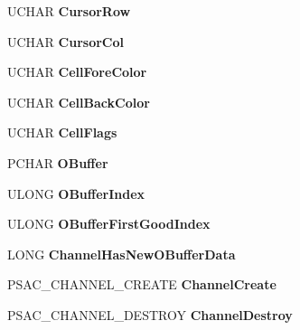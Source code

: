 \begin{DoxyCompactItemize}
U\+C\+H\+AR {\bfseries Cursor\+Row}
\item 
\mbox{\label{struct___s_a_c___c_h_a_n_n_e_l_a74e58345986901edece4d1c602bc3a98}} 
U\+C\+H\+AR {\bfseries Cursor\+Col}
\item 
\mbox{\label{struct___s_a_c___c_h_a_n_n_e_l_a8a955ed1cd5df6ea4d95e5224ae60296}} 
U\+C\+H\+AR {\bfseries Cell\+Fore\+Color}
\item 
\mbox{\label{struct___s_a_c___c_h_a_n_n_e_l_ae06e9fb8bd1d5fe9b3a111cab7cd0c3c}} 
U\+C\+H\+AR {\bfseries Cell\+Back\+Color}
\item 
\mbox{\label{struct___s_a_c___c_h_a_n_n_e_l_a3875ae45764a80e0c99e32d5603cee0c}} 
U\+C\+H\+AR {\bfseries Cell\+Flags}
\item 
\mbox{\label{struct___s_a_c___c_h_a_n_n_e_l_a75dd15cb51a4fc46b90a0b940163390a}} 
P\+C\+H\+AR {\bfseries O\+Buffer}
\item 
\mbox{\label{struct___s_a_c___c_h_a_n_n_e_l_ae4f5308ce9e3b081e3c7c4deb0a412f3}} 
U\+L\+O\+NG {\bfseries O\+Buffer\+Index}
\item 
\mbox{\label{struct___s_a_c___c_h_a_n_n_e_l_ac745b2b8be4ea404e48f4fe2f0ec9a2d}} 
U\+L\+O\+NG {\bfseries O\+Buffer\+First\+Good\+Index}
\item 
\mbox{\label{struct___s_a_c___c_h_a_n_n_e_l_ab97c5199439172d12e2cea63761101af}} 
L\+O\+NG {\bfseries Channel\+Has\+New\+O\+Buffer\+Data}
\item 
\mbox{\label{struct___s_a_c___c_h_a_n_n_e_l_ad499841a7c3979d0938f7a6b17aa8e36}} 
P\+S\+A\+C\+\_\+\+C\+H\+A\+N\+N\+E\+L\+\_\+\+C\+R\+E\+A\+TE {\bfseries Channel\+Create}
\item 
\mbox{\label{struct___s_a_c___c_h_a_n_n_e_l_a988cdd492b9bc68594a6d7b7db53f7b5}} 
P\+S\+A\+C\+\_\+\+C\+H\+A\+N\+N\+E\+L\+\_\+\+D\+E\+S\+T\+R\+OY {\bfseries Channel\+Destroy}

\end{DoxyCompactItemize}
